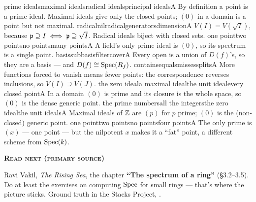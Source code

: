 \begin{quizlist}
    {prime ideals}{maximal ideals}{radical ideals}{principal ideals}{A}
    {By definition a point is a prime ideal. Maximal ideals give only the closed
     points; $(0)$ in a domain is a point but not maximal.}
    {radical}{nilradical}{generators}{dimension}{A}
    {$V(I)=V(\sqrt I)$, because $\mathfrak{p}\supseteq I \iff \mathfrak{p}\supseteq\sqrt I$.
     Radical ideals biject with closed sets.}
    {one point}{two points}{no points}{many points}{A}
    {A field's only prime ideal is $(0)$, so its spectrum is a single point.}
    {basis}{subbasis}{filter}{cover}{A}
    {Every open is a union of $D(f)$'s, so they are a basis --- and
     $D(f)\cong\operatorname{Spec}(R_f)$.}
    {contains}{equals}{misses}{splits}{A}
    {More functions forced to vanish means fewer points: the correspondence
     reverses inclusions, so $V(I)\supseteq V(J)$.}
    {the zero ideal}{a maximal ideal}{the unit ideal}{every closed point}{A}
    {In a domain $(0)$ is prime and its closure is the whole space, so $(0)$ is
     the dense generic point.}
    {the prime numbers}{all the integers}{the zero ideal}{the unit ideals}{A}
    {Maximal ideals of $\mathbb{Z}$ are $(p)$ for $p$ prime; $(0)$ is the (non-closed)
     generic point.}
    {one point}{two points}{no points}{four points}{A}
    {The only prime is $(x)$ --- one point --- but the nilpotent $x$ makes it a
     ``fat'' point, a different scheme from $\operatorname{Spec}(k)$.}
\end{quizlist}

\begin{primarybox}
\textbf{\textsc{\textcolor{accentB}{Read next (primary source)}}}\par\smallskip
Ravi Vakil, \emph{The Rising Sea}, the chapter \textbf{``The spectrum of a
ring''} (\S3.2--3.5). Do at least the exercises on computing $\operatorname{Spec}$ for small
rings --- that's where the picture sticks. Ground truth in the Stacks Project,
.
\end{primarybox}
